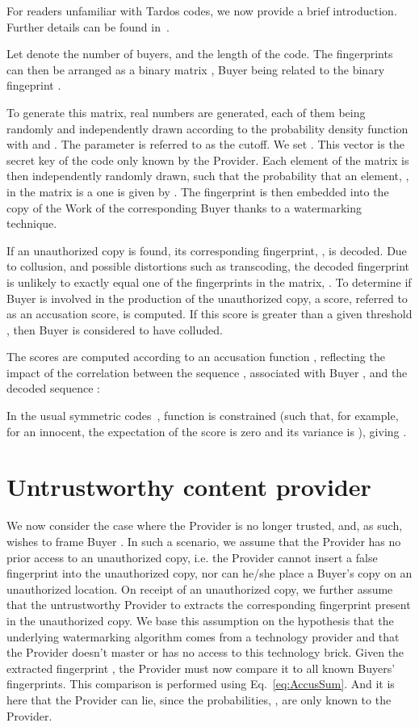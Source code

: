 \documentclass{article}
\begin{document}
For readers unfamiliar with Tardos codes, we now provide a brief
introduction. Further details can be found in~\cite{SkoricSymmetric}. 

Let  denote the number of buyers, and  the length of the
code. The fingerprints can then be arranged as a binary  matrix , Buyer  being related to the binary
fingeprint .

To generate this matrix,  real numbers  are
generated, each of them being randomly and independently drawn
according to the probability density function
 with  and .
The parameter  is referred to as the cutoff. We set
. This vector  is the
secret key of the code only known by the Provider.
Each element of the matrix  is then
independently randomly drawn, such that the probability that an
element, , in the matrix is a one is given by
. The fingerprint is then embedded
into the copy of the Work of the corresponding Buyer thanks to a watermarking technique.

If an unauthorized copy is found, its corresponding fingerprint,
, is decoded.  Due to collusion, and possible distortions
such as transcoding, the decoded fingerprint is unlikely to exactly
equal one of the fingerprints in the matrix, .  To
determine if Buyer  is involved in the production of the
unauthorized copy, a score, referred to as an accusation score, 
is computed.  If this score is greater than a given threshold ,
then Buyer  is considered to have colluded.


The scores are computed according to an accusation function ,
reflecting the impact of the correlation between the sequence
, associated with Buyer , and the decoded sequence
:

In the usual symmetric codes~\cite{SkoricSymmetric}, function  is
constrained (such that, for example, for an innocent, the expectation
of the score is zero and its variance is ), giving .

\section{Untrustworthy content provider}
\label{sec:untrustworthy}

We now consider the case
where the Provider is no longer trusted, and, as such, wishes
to frame Buyer .  In such a scenario, we assume that the Provider
has no prior access to an unauthorized copy, i.e. the Provider cannot
insert a false fingerprint into the unauthorized copy, nor can he/she
place a Buyer's copy on an unauthorized location.  On receipt of an
unauthorized copy, we further assume that the untrustworthy Provider
to extracts the corresponding fingerprint present in the unauthorized
copy.  We base this assumption on the hypothesis that the underlying
watermarking algorithm comes from a technology provider and that the
Provider doesn't master or has no access to this technology
brick.  Given the extracted fingerprint  , the Provider must now compare
it to all known Buyers' fingerprints.  This comparison is performed
using Eq.~\eqref{eq:AccusSum}.  And it is here that the Provider can
lie, since the probabilities, , are only known to the
Provider.
\end{document}
